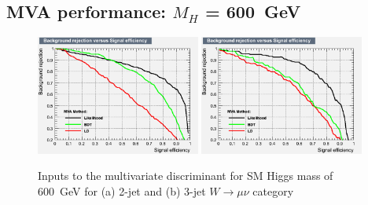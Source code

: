 \subsection{MVA performance: \texorpdfstring{$M_H$}{M(H)} = 600~GeV}
\begin{figure}[ht]
  \centering
  \includegraphics[width=0.48\textwidth]{figs/TMVA_600_nJ2_mu_rejBvsS}
  \includegraphics[width=0.48\textwidth]{figs/TMVA_600_nJ3_mu_rejBvsS}	
  \caption{\label{fig:perf600mu}Inputs to the multivariate discriminant for SM Higgs mass of 600~GeV for (a) 2-jet and (b) 3-jet $W\to\mu\nu$ category}
\end{figure}
